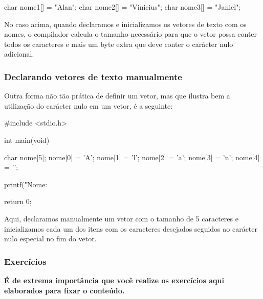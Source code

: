 \begin{excode}
    char nome1[] = "Alan";
    char nome2[] = "Vinicius";
    char nome3[] = "Janiel";
\end{excode}

No caso acima, quando declaramos e inicializamos os vetores de texto com os 
nomes, o compilador calcula o tamanho necessário para que o vetor possa conter 
todos os caracteres e mais um byte extra que deve conter o carácter nulo adicional.

\subsubsection{Declarando vetores de texto manualmente}

Outra forma não tão prática de definir um vetor, mas que ilustra bem a 
utilização do carácter nulo em um vetor, é a seguinte:

\begin{excode}
    #include <stdio.h>

    int main(void)
    {
        char nome[5];
        nome[0] = 'A';
        nome[1] = 'l';
        nome[2] = 'a';
        nome[3] = 'n';
        nome[4] = '\0';

        printf("Nome: %

        return 0;
    }
\end{excode}

Aqui, declaramos manualmente um vetor com o tamanho de 5 caracteres e 
inicializamos cada um dos itens com os caracteres desejados seguidos ao 
carácter nulo especial no fim do vetor.

\subsubsection{Exercícios}

\textbf{É de extrema importância que você realize os exercícios aqui elaborados para fixar o conteúdo.}

